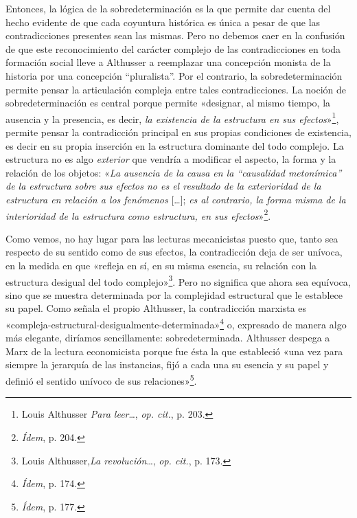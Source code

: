 Entonces, la lógica de la sobredeterminación es la que permite dar cuenta del hecho evidente de que cada coyuntura histórica es única a pesar de que las contradicciones presentes sean las mismas. Pero no debemos caer en la confusión de que este reconocimiento del carácter complejo de las contradicciones en toda formación social lleve a Althusser a reemplazar una concepción monista de la historia por una concepción ``pluralista''. Por el contrario, la sobredeterminación permite pensar la articulación compleja entre tales contradicciones. La noción de sobredeterminación es central porque permite «designar, al mismo tiempo, la ausencia y la presencia, es decir, \emph{la existencia de la estructura en sus efectos}»\footnote{Louis Althusser \emph{Para leer}\ldots, \emph{op. cit.}, p. 203.}, permite pensar la contradicción principal en sus propias condiciones de existencia, es decir en su propia inserción en la estructura dominante del todo complejo. La estructura no es algo \emph{exterior} que vendría a modificar el aspecto, la forma y la relación de los objetos: «\emph{La ausencia de la causa en la ``causalidad metonímica'' de la estructura sobre sus efectos no es el resultado de la exterioridad de la estructura en relación a los fenómenos} {[}\ldots{]}; \emph{es al contrario, la forma misma de la interioridad de la estructura como estructura, en sus efectos}»\footnote{\emph{Ídem}, p. 204.}.

Como vemos, no hay lugar para las lecturas mecanicistas puesto que, tanto sea respecto de su sentido como de sus efectos, la contradicción deja de ser unívoca, en la medida en que «refleja en sí, en su misma esencia, su relación con la estructura desigual del todo complejo»\footnote{Louis Althusser,\emph{La revolución}\ldots, \emph{op. cit.}, p. 173.}. Pero no significa que ahora sea equívoca, sino que se muestra determinada por la complejidad estructural que le establece su papel. Como señala el propio Althusser, la contradicción marxista es «compleja-estructural-desigualmente-determinada»\footnote{\emph{Ídem}, p. 174.} o, expresado de manera algo más elegante, diríamos sencillamente: sobredeterminada. Althusser despega a Marx de la lectura economicista porque fue ésta la que estableció «una vez para siempre la jerarquía de las instancias, fijó a cada una su esencia y su papel y definió el sentido unívoco de sus relaciones»\footnote{\emph{Ídem}, p. 177.}.

